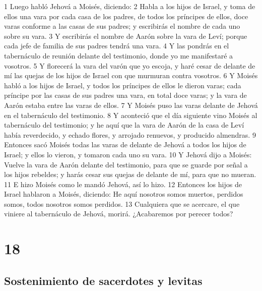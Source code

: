 1 Luego habló Jehová a Moisés, diciendo:
2 Habla a los hijos de Israel, y toma de ellos una vara por cada casa de los padres, de todos los príncipes de ellos, doce varas conforme a las casas de sus padres; y escribirás el nombre de cada uno sobre su vara.
3 Y escribirás el nombre de Aarón sobre la vara de Leví; porque cada jefe de familia de sus padres tendrá una vara.
4 Y las pondrás en el tabernáculo de reunión delante del testimonio, donde yo me manifestaré a vosotros.
5 Y florecerá la vara del varón que yo escoja, y haré cesar de delante de mí las quejas de los hijos de Israel con que murmuran contra vosotros.
6 Y Moisés habló a los hijos de Israel, y todos los príncipes de ellos le dieron varas; cada príncipe por las casas de sus padres una vara, en total doce varas; y la vara de Aarón estaba entre las varas de ellos.
7 Y Moisés puso las varas delante de Jehová en el tabernáculo del testimonio.
8 Y aconteció que el día siguiente vino Moisés al tabernáculo del testimonio; y he aquí que la vara de Aarón de la casa de Leví había reverdecido, y echado flores, y arrojado renuevos, y producido almendras. 
9 Entonces sacó Moisés todas las varas de delante de Jehová a todos los hijos de Israel; y ellos lo vieron, y tomaron cada uno su vara.
10 Y Jehová dijo a Moisés: Vuelve la vara de Aarón delante del testimonio, para que se guarde por señal a los hijos rebeldes; y harás cesar sus quejas de delante de mí, para que no mueran.
11 E hizo Moisés como le mandó Jehová, así lo hizo.
12 Entonces los hijos de Israel hablaron a Moisés, diciendo: He aquí nosotros somos muertos, perdidos somos, todos nosotros somos perdidos.
13 Cualquiera que se acercare, el que viniere al tabernáculo de Jehová, morirá. ¿Acabaremos por perecer todos?

\chapter{18}

\section*{Sostenimiento de sacerdotes y levitas}

